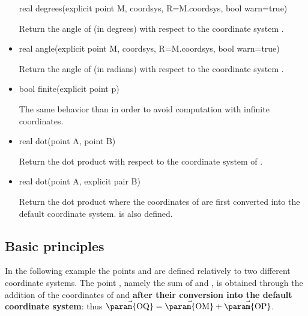 \documentclass[pdftex]{article}
\begin{document}
\begin{itemize}
  \begin{Vcolor}
    real degrees(explicit point M, coordsys,
    R=M.coordsys, bool warn=true)
  \end{Vcolor}
  Return the angle of  (in degrees) with respect to the  coordinate system .
\item {}
  \begin{Vcolor}
    real angle(explicit point M, coordsys,
    R=M.coordsys, bool warn=true)
  \end{Vcolor}
  Return the angle of  (in radians) with respect to the  coordinate system .
\item {}
  \begin{Vcolor}
    bool finite(explicit point p)
  \end{Vcolor}
  The same behavior than  in order to avoid
  computation with infinite coordinates.
\item {}
  \begin{Vcolor}
    real dot(point A, point B)
  \end{Vcolor}
  Return the dot product  with respect to the
  coordinate system of .
\item {}
  \begin{Vcolor}
    real dot(point A, explicit pair B)
  \end{Vcolor}
  Return the dot product   where the coordinates
  of  are first converted into the default coordinate system.
   is also defined.

\end{itemize}

\subsection{Basic principles}
In the following example the points  and  are
defined relatively to two different coordinate systems. The
point , namely the sum of  and , is
obtained through the addition of the coordinates of 
and  \textbf{after their conversion into the default
  coordinate system}: thus  $\vec{\mbox{\param{OQ}}}=\vec{\mbox{\param{OM}}}+\vec{\mbox{\param{OP}}}$.
\end{document}
